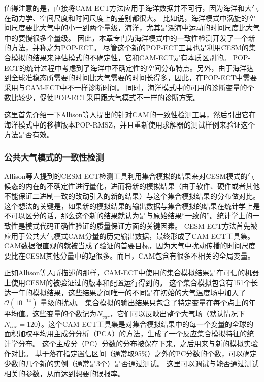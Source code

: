 值得注意的是，直接将CAM-ECT方法应用于海洋数据并不可行，因为海洋和大气在动力学、空间尺度和时间尺度上的差别都很大。
比如说，海洋模式中涡旋的空间尺度要比大气中的小一到两个量级，海洋，尤其是深海中运动的时间尺度比大气中的要慢很多个量级。
因此，本章专门为海洋模式中的一致性检测开发了一个新的方法，并称之为POP-ECT。 
尽管这个新的POP-ECT工具也是利用CESM的集合模拟的结果来评估模式的不确定性，它和CAM-ECT是有本质区别的。 
POP-ECT的统计过程中考虑到了海洋中不确定性的空间分布特点。另外，由于海洋达到全球准稳态所需要的时间比大气需要的时间长得多，因此，在POP-ECT中需要采用与CAM-ECT中不一样诊断时间。 
同时，海洋模式中的可用的诊断变量的个数比较少，促使POP-ECT采用跟大气模式不一样的诊断方案。 

这里首先介绍一下Allison等人提出的针对CAM的一致性检测工具，然后引出它在海洋模式中的移植版本POP-RMSZ，并且重新使用求解器的测试样例来验证这个方法是否有效。

\subsubsection{公共大气模式的一致性检测 }
\label{verify:CAM}
Allison等人\cite{baker2015}提到的CESM-ECT检测工具利用集合模拟的结果来对CESM模式的气候态的内在的不确定性进行量化，进而将新的模拟结果（由于软件、硬件或者其他不能保证二进制一致的改动引入的新的结果）与这个集合模拟结果的分布做对比。
这个想法的关键是，如果新的模拟结果的输出数据与集合模拟的结果在统计学上是不可以区分的话，那么这个新的结果就认为是与原始结果“一致的”。统计学上的一致性是模式代码正确性验证的质量保证方面的关键因素\cite{oberkampf2010}。
CESM-ECT方法首先被应用于公共大气模式CAM分量的历史输出数据，最终形成了CAM-ECT工具集。
CAM数据很直观的就被当成了验证的首要目标，因为大气中扰动传播的时间尺度要比在CESM其他分量中的短很多。而且，CAM包含有很多不相关的全局变量。 


 
正如Allison等人\cite{baker2015}所描述的那样，CAM-ECT中使用的集合模拟结果是在可信的机器上使用CESM的被验证过的版本和配置运行得到的。 
这个集合模拟包含有151个长达一年的模拟结果，这些结果之间唯一的不同是在初始的大气温度场中加入了$\mathcal{O}(10^{-14})$ 量级的扰动。 
集合模拟的输出结果只包含了特定变量在每个点上的年平均值。这些变量的个数记为$N_{var}$，它们可以反映出整个大气场（默认情况下 $N_{var}=120$）。这个CAM-ECT工具集是对集合模拟结果中的每一个变量的全球的面积加权平均用主成分分析（PCA）的方法，生成了一个反应集合模拟特征的统计学分布。
这个主成分（PC）分数的分布被保存下来，之后用来与新的模拟实验作对比。 
基于落在指定置信区间（通常取95$\%$）之外的PC分数的个数，可以确定少数的几个新的实例（通常是3个）是否通过测试。 
这里可以调试与能否通过测试相关的参数，从而达到想要的误报率。


